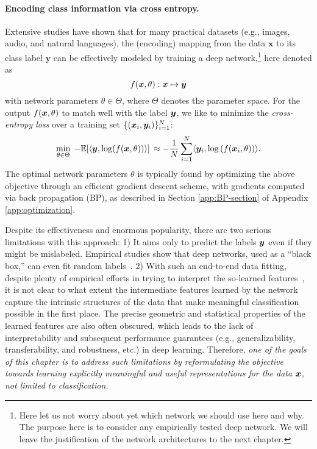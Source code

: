 \documentclass[../../book-main.tex]{subfiles}
\begin{document}
\paragraph{Encoding class information via cross entropy.}  Extensive studies have shown that for many practical datasets (e.g., images, audio, and natural languages), the (encoding) mapping from the data $\bm{x}$ to its class label $\bm{y}$ can be effectively modeled by training a deep network,\footnote{Here let us not worry about yet which network we should use here and why. The purpose here is to consider any empirically tested deep network. We will leave the justification of the network architectures to the next chapter.} here denoted as $$f(\bm{x}, \theta):\bm{x} \mapsto \bm{y}$$ with network parameters $\theta \in \Theta$, where $\Theta$ denotes the parameter space. For the output $f(\bm{x}, \theta)$ to match well with the label $\bm{y}$, we like to  minimize the {\em cross-entropy loss} over a training set $\{(\bm{x}_i, \bm{y}_i)\}_{i=1}^N$: 
\begin{equation}
   \min_{\theta \in \Theta} \; - \mathbb{E}[\langle \bm{y}, \log(f(\bm{x}, \theta)) \rangle] \, \approx - \frac{1}{N}\sum_{i=1}^N \langle \bm{y}_i, \log\left(f(\bm{x}_i, \theta)\right) \rangle.
   \label{chap4-eqn:cross-entropy}
\end{equation}
The optimal network parameters $\theta $ is typically found by optimizing the above objective through an efficient gradient descent scheme, with gradients computed via back propagation (BP), as described in Section \ref{app:BP-section} of Appendix \ref{app:optimization}.

Despite its effectiveness and enormous popularity, there are two serious limitations with this approach:  1) It aims only to predict the labels $\bm{y}$ even if they might be mislabeled. Empirical studies show that deep networks, used as a ``black box,'' can even fit random labels~\cite{zhang2017understanding}.
2) With such an end-to-end data fitting,
despite plenty of empirical efforts in trying to interpret the so-learned features~\cite{Zeiler-ECCV2014},
it is not clear to what extent the intermediate features learned by the network capture the intrinsic structures of the data that make meaningful classification possible in the first place. The precise geometric and statistical properties of the learned features are also often obscured, which leads to the lack of interpretability and subsequent performance guarantees (e.g., generalizability, transferability, and robustness, etc.) in deep learning.
Therefore, {\em one of the goals of this chapter is to address such limitations by reformulating the objective towards learning explicitly meaningful and useful representations for the data $\bm{x}$, not limited to classification.}
\end{document}
